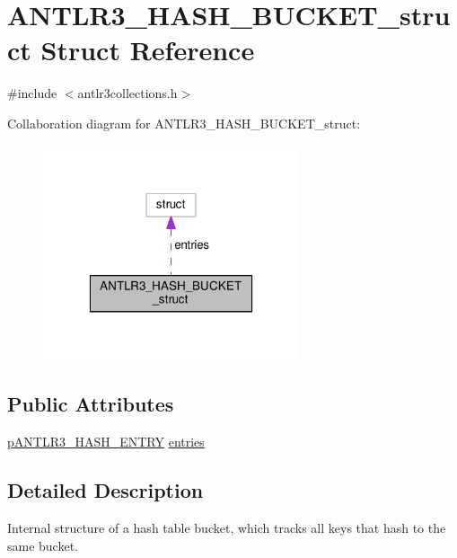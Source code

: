 \hypertarget{struct_a_n_t_l_r3___h_a_s_h___b_u_c_k_e_t__struct}{\section{A\-N\-T\-L\-R3\-\_\-\-H\-A\-S\-H\-\_\-\-B\-U\-C\-K\-E\-T\-\_\-struct Struct Reference}
\label{struct_a_n_t_l_r3___h_a_s_h___b_u_c_k_e_t__struct}
}


{\ttfamily \#include $<$antlr3collections.\-h$>$}



Collaboration diagram for A\-N\-T\-L\-R3\-\_\-\-H\-A\-S\-H\-\_\-\-B\-U\-C\-K\-E\-T\-\_\-struct\-:
\nopagebreak
\begin{figure}[H]
\begin{center}
\leavevmode
\includegraphics[width=214pt]{struct_a_n_t_l_r3___h_a_s_h___b_u_c_k_e_t__struct__coll__graph}
\end{center}
\end{figure}
\subsection*{Public Attributes}
\begin{DoxyCompactItemize}
\item 
\hyperlink{antlr3interfaces_8h_a23202440c7441d8812a77e62318aafc9}{p\-A\-N\-T\-L\-R3\-\_\-\-H\-A\-S\-H\-\_\-\-E\-N\-T\-R\-Y} \hyperlink{struct_a_n_t_l_r3___h_a_s_h___b_u_c_k_e_t__struct_afb3fca56096d22730d56e3347c76d5d8}{entries}
\end{DoxyCompactItemize}


\subsection{Detailed Description}
Internal structure of a hash table bucket, which tracks all keys that hash to the same bucket. 

